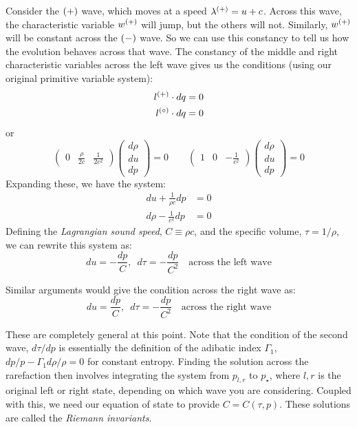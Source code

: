 Consider the ${(+)}$ wave, which moves at a speed $\lambda^{(+)} = u
+c$.  Across this wave, the characteristic variable $w^{(+)}$ will
jump, but the others will not.  Similarly, $w^{(+)}$ will be constant
across the ${(-)}$ wave.  So we can use this constancy to tell us how
the evolution behaves across that wave.  The constancy of the middle and right characteristic variables across the left
wave gives us the conditions (using our original primitive variable system):
\begin{align}
l^{(+)} \cdot dq &= 0 \\
l^{(\circ)} \cdot dq &= 0 
\end{align}
or 
\begin{equation}
\left ( \begin{array}{ccc} 0 & \frac{\rho}{2c} & \frac{1}{2c^2} \end{array} \right)
   \left ( \begin{array}{c} d\rho \\ du \\ dp \end{array} \right ) = 0
\qquad
%
\left ( \begin{array}{ccc} 1 & 0 & -\frac{1}{c^2} \end{array} \right)
   \left ( \begin{array}{c} d\rho \\ du \\ dp \end{array} \right ) = 0
\end{equation}
Expanding these, we have the system:
\begin{align}
du + \frac{1}{\rho c} dp &= 0 \\
d\rho - \frac{1}{c^2} dp &= 0 
\end{align}
Defining the {\em Lagrangian sound speed}, $C \equiv \rho c$, and the 
specific volume, $\tau = 1/\rho$, we can rewrite this system as:
\begin{equation}
du = -\frac{dp}{C} , \,\,\, d\tau = -\frac{dp}{C^2} \quad \mbox{across the left wave}
\end{equation}

Similar arguments would give the condition across the right wave as:
\begin{equation}
du = \frac{dp}{C} , \,\,\, d\tau = -\frac{dp}{C^2} \quad \mbox{across the right wave}
\end{equation}

These are completely general at this point.  Note that the condition
of the second wave, $d\tau/dp$ is essentially the definition of the
adibatic index $\Gamma_1$, $dp/p - \Gamma_1 d\rho/\rho = 0$ for
constant entropy.  Finding the solution across the rarefaction then
involves integrating the system from $p_{l,r}$ to $p_\star$, where $l,
r$ is the original left or right state, depending on which wave you
are considering.  Coupled with this, we need our equation of state to
provide $C = C(\tau, p)$.  These solutions are called the {\em Riemann
  invariants}.

